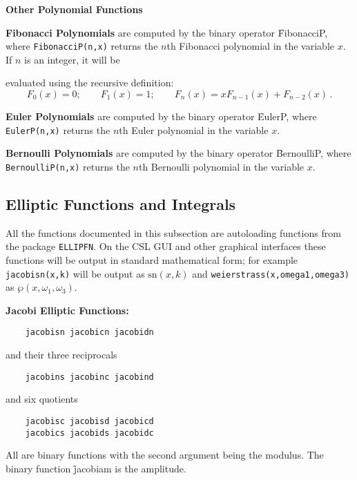 \textbf{Other Polynomial Functions}
\hypertarget{operator:FIBONACCIP}{}

\textbf{Fibonacci Polynomials} are computed by the binary operator
\f{FibonacciP}, where
\texttt{FibonacciP(n,x)} returns the $n$th Fibonacci polynomial
in the variable $x$. If $n$ is an integer, it will be

evaluated using the recursive definition:
\[F_0(x) = 0;\qquad F_1(x) = 1; \qquad F_n(x) = x F_{n-1}(x) + F_{n-2}(x)\,.\]

\textbf{Euler Polynomials} are computed by the binary operator
\f{EulerP}, where\linebreak
\texttt{EulerP(n,x)} returns the $n$th Euler polynomial in the variable $x$.

\textbf{Bernoulli Polynomials} are computed by the binary operator
\f{BernoulliP}, where \texttt{BernoulliP(n,x)} returns the
$n$th Bernoulli polynomial in the variable $x$.

\subsection{Elliptic Functions and Integrals}
All the functions documented in this subsection are autoloading
functions from the package \texttt{ELLIPFN}.  On the CSL GUI and other graphical
interfaces these functions will be output in standard mathematical form;
for example \texttt{jacobisn(x,k)} will be output as $\mathrm{sn}(x,k)$ and
\texttt{weierstrass(x,omega1,omega3)} as $\wp(x,\omega_1,\omega_3)$.

\textbf{Jacobi Elliptic Functions:}
\begin{verbatim}
    jacobisn jacobicn jacobidn
\end{verbatim}
and their three reciprocals
\begin{verbatim}
    jacobins jacobinc jacobind
\end{verbatim}
and six quotients
\begin{verbatim}
    jacobisc jacobisd jacobicd
    jacobics jacobids jacobidc
\end{verbatim}
All are binary functions with the second argument being the modulus.
The binary function \f{jacobiam} is the amplitude.

